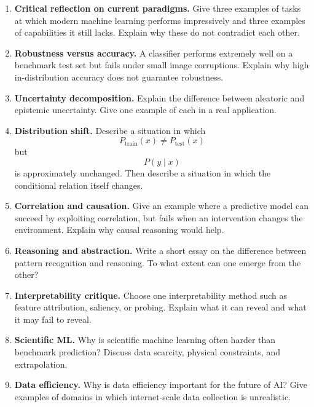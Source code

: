 \begin{enumerate}
    \item \textbf{Critical reflection on current paradigms.}
    Give three examples of tasks at which modern machine learning performs impressively and three examples of capabilities it still lacks. Explain why these do not contradict each other.

    \item \textbf{Robustness versus accuracy.}
    A classifier performs extremely well on a benchmark test set but fails under small image corruptions. Explain why high in-distribution accuracy does not guarantee robustness.

    \item \textbf{Uncertainty decomposition.}
    Explain the difference between aleatoric and epistemic uncertainty. Give one example of each in a real application.

    \item \textbf{Distribution shift.}
    Describe a situation in which
    \[
    P_{\mathrm{train}}(x) \neq P_{\mathrm{test}}(x)
    \]
    but
    \[
    P(y\mid x)
    \]
    is approximately unchanged. Then describe a situation in which the conditional relation itself changes.

    \item \textbf{Correlation and causation.}
    Give an example where a predictive model can succeed by exploiting correlation, but fails when an intervention changes the environment. Explain why causal reasoning would help.

    \item \textbf{Reasoning and abstraction.}
    Write a short essay on the difference between pattern recognition and reasoning. To what extent can one emerge from the other?

    \item \textbf{Interpretability critique.}
    Choose one interpretability method such as feature attribution, saliency, or probing. Explain what it can reveal and what it may fail to reveal.

    \item \textbf{Scientific ML.}
    Why is scientific machine learning often harder than benchmark prediction? Discuss data scarcity, physical constraints, and extrapolation.

    \item \textbf{Data efficiency.}
    Why is data efficiency important for the future of AI? Give examples of domains in which internet-scale data collection is unrealistic.


\end{enumerate}
